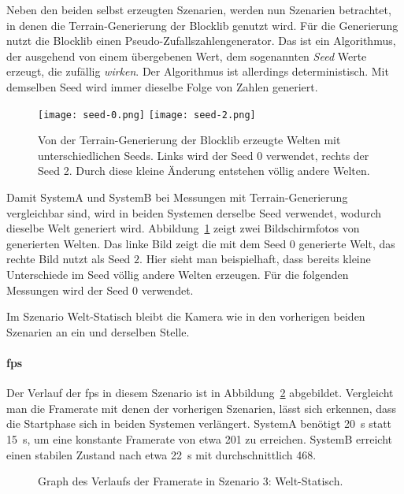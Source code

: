 Neben den beiden selbst erzeugten Szenarien, werden nun Szenarien betrachtet, in denen die Terrain-Generierung der Blocklib genutzt wird. Für die Generierung nutzt die Blocklib einen Pseudo-Zufallszahlengenerator. Das ist ein Algorithmus, der ausgehend von einem übergebenen Wert, dem sogenannten \emph{Seed} Werte erzeugt, die zufällig \emph{wirken}. Der Algorithmus ist allerdings deterministisch. Mit demselben Seed wird immer dieselbe Folge von Zahlen generiert.

\begin{figure}
	\centering
	\texttt{[image: seed-0.png]}
	\hfill
	\texttt{[image: seed-2.png]}
	\caption[Von der Terrain-Generierung der Blocklib erzeugte Welten mit unterschiedlichen Seeds.]{Von der Terrain-Generierung der Blocklib erzeugte Welten mit unterschiedlichen Seeds. Links wird der Seed 0 verwendet, rechts der Seed 2. Durch diese kleine Änderung entstehen völlig andere Welten.}\label{fig:static}
\end{figure}
Damit SystemA und SystemB bei Messungen mit Terrain-Generierung vergleichbar sind, wird in beiden Systemen derselbe Seed verwendet, wodurch dieselbe Welt generiert wird. Abbildung~\ref{fig:static} zeigt zwei Bildschirmfotos von generierten Welten. Das linke Bild zeigt die mit dem Seed $0$ generierte Welt, das rechte Bild nutzt als Seed $2$. Hier sieht man beispielhaft, dass bereits kleine Unterschiede im Seed völlig andere Welten erzeugen. Für die folgenden Messungen wird der Seed $0$ verwendet. 

Im Szenario Welt-Statisch bleibt die Kamera wie in den vorherigen beiden Szenarien an ein und derselben Stelle.



\paragraph{\ac{fps}}

Der Verlauf der \ac{fps} in diesem Szenario ist in Abbildung~\ref{fig:seed-0-static-fps} abgebildet. Vergleicht man die Framerate mit denen der vorherigen Szenarien, lässt sich erkennen, dass die Startphase sich in beiden Systemen verlängert. SystemA benötigt \SI{20}{\second} statt \SI{15}{\second}, um eine konstante Framerate von etwa \SI{201}{\fps} zu erreichen. SystemB erreicht einen stabilen Zustand nach etwa \SI{22}{\second} mit durchschnittlich \SI{468}{\fps}.

\begin{figure}[!htbp]
	\caption{Graph des Verlaufs der Framerate in Szenario 3: Welt-Statisch.}\label{fig:seed-0-static-fps}
\end{figure}

